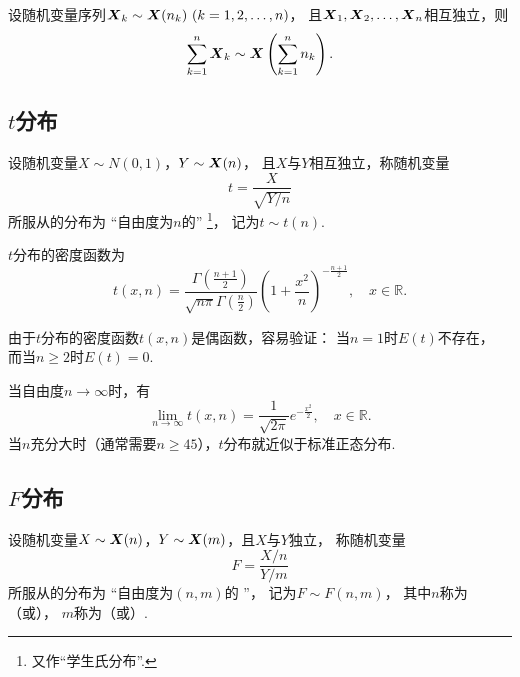\begin{corollary}\label{theorem:数理统计的基础知识.卡方分布的可加性2}
设随机变量序列\(\x_k \sim \x(n_k)\ (k=1,2,\dotsc,n)\)，
且\(\boldsymbol{X}_1,\boldsymbol{X}_2,\dotsc,\boldsymbol{X}_n\)相互独立，则\begin{equation}
	\sum_{k=1}^n \boldsymbol{X}_k \sim \boldsymbol{X}\left(\sum_{k=1}^n{n_k}\right).
\end{equation}
\end{corollary}

\subsection{\texorpdfstring{\(t\)}{t}分布}
\begin{definition}
设随机变量\(X \sim N(0,1)\)，\(Y \sim \boldsymbol{X}(n)\)，
且\(X\)与\(Y\)相互独立，称随机变量\begin{equation}
	t = \frac{X}{\sqrt{Y/n}}
\end{equation}
所服从的分布为
“自由度为\(n\)的”
\footnote{又作“学生氏分布”.}，
记为\(t \sim t(n)\).
\end{definition}

\begin{theorem}\label{theorem:数理统计的基础知识.学生氏分布的密度函数}
\(t\)分布的密度函数为\begin{equation}
	t(x,n) = \frac{
		\Gamma\left(\frac{n+1}{2}\right)
	}{
		\sqrt{n\pi} \Gamma\left(\frac{n}{2}\right)
	}
	\left(1+\frac{x^2}{n}\right)^{-\frac{n+1}{2}},
	\quad x \in \mathbb{R}.
\end{equation}
\end{theorem}

由于\(t\)分布的密度函数\(t(x,n)\)是偶函数，容易验证：
当\(n=1\)时\(E(t)\)不存在，
而当\(n \geq 2\)时\(E(t)=0\).

当自由度\(n\to\infty\)时，有\[
	\lim_{n\to\infty} t(x,n) = \frac{1}{\sqrt{2\pi}} e^{-\frac{x^2}{2}},
	\quad x \in \mathbb{R}.
\]
当\(n\)充分大时（通常需要\(n \geq 45\)），\(t\)分布就近似于标准正态分布.

\subsection{\texorpdfstring{\(F\)}{F}分布}
\begin{definition}
设随机变量\(X \sim \boldsymbol{X}(n)\)，\(Y \sim \boldsymbol{X}(m)\)，且\(X\)与\(Y\)独立，
称随机变量\begin{equation}
	F=\frac{X/n}{Y/m}
\end{equation}
所服从的分布为
“自由度为\((n,m)\)的 ”，
记为\(F \sim F(n,m)\)，
其中\(n\)称为（或），
\(m\)称为（或）.
\end{definition}

